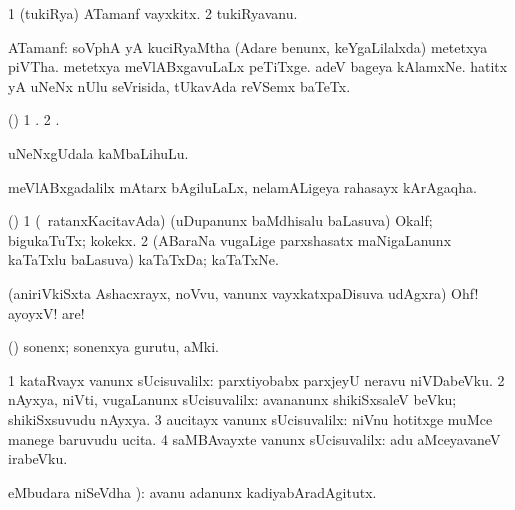 \bentry
{}
\gl{\nA}
\bmng
\bnum
\num{1} (tukiRya) ATamanf vayxkitx. 
\num{2} tukiRyavanu. 
\enum
\emng
\eentry

\bentry
{}
\gl{\nA}
\bmng
ATamanf: 
\banum
{} soVphA yA kuciRyaMtha (Adare benunx, keYgaLilalxda) metetxya piVTha. 
 metetxya meVlABxgavuLaLx peTiTxge. 
 adeV bageya kAlamxNe. 
 hatitx yA uNeNx nUlu seVrisida, tUkavAda reVSemx baTeTx. 
\eanum
\emng
\eentry

\bentry
{}
\gl{\saMkiSx}
\bmng
(\birx) 
\bnum
\num{1} . 
\num{2} . 
\enum
\emng
\eentry

\bentry
{}
\gl{\nA}
\bmng
uNeNxgUdala kaMbaLihuLu. 
\emng
\eentry

\bentry
{}
\gl{\nA}
\bmng
meVlABxgadalilx mAtarx bAgiluLaLx, nelamALigeya rahasayx kArAgaqha. 
\emng
\eentry

\bentry
{}
\gl{\nA}
\bmng
(\pArxparx) 
\bnum
\num{1} (\sA\ ratanxKacitavAda) (uDupanunx baMdhisalu baLasuva) Okalf; bigukaTuTx; kokekx. 
\num{2} (ABaraNa \mo vugaLige parxshasatx maNigaLanunx kaTaTxlu baLasuva) kaTaTxDa; kaTaTxNe. 
\enum
\emng
\eentry

\bentry
{}
\gl{\BAavayx}
\bmng
(aniriVkiSxta Ashacxrayx, noVvu, \mo vanunx vayxkatxpaDisuva udAgxra) Ohf! ayoyxV! are! 
\emng
\eentry

\bentry
{}
\gl{\nA}
\bmng
(\AmA) sonenx; sonenxya gurutu, aMki. 
\emng
\eentry

\bentry
{}
\bmng
\bnum
\num{1} kataRvayx \mo vanunx sUcisuvalilx:  parxtiyobabx parxjeyU neravu niVDabeVku. 
\num{2} nAyxya, niVti, \mo vugaLanunx sUcisuvalilx:  avananunx shikiSxsaleV beVku; shikiSxsuvudu nAyxya. 
\num{3} aucitayx \mo vanunx sUcisuvalilx:  niVnu hotitxge muMce manege baruvudu ucita. 
\num{4} saMBAvayxte \mo vanunx sUcisuvalilx:  adu aMceyavaneV irabeVku. 
\enum
\emng

\noindent
\gl{\pagu}
\bmng
{} eMbudara niSeVdha \rUpa):  avanu adanunx kadiyabAradAgitutx. 
\emng
\eentry

